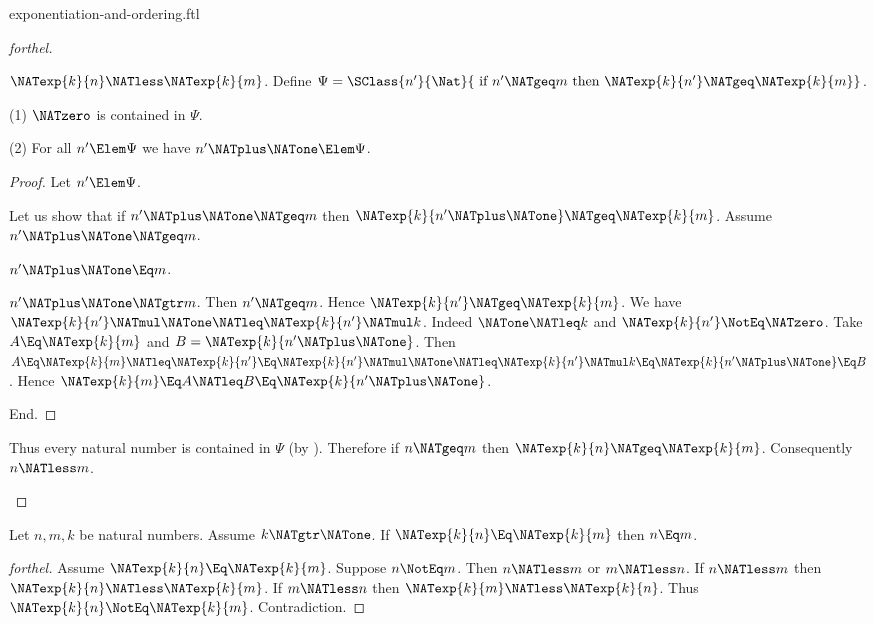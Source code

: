 \documentclass{stex}
\begin{document}
\begin{smodule}{exponentiation-and-ordering.ftl}
\begin{proof}[forthel]
  \begin{case}{$\NATexp{k}{n} \NATless \NATexp{k}{m}$.}
    Define $\Psi = \SClass{n'}{\Nat}{\text{ if }n' \NATgeq m\text{ then }
    \NATexp{k}{n'} \NATgeq \NATexp{k}{m}}$.

    (1) $\NATzero$ is contained in $\Psi$.

    (2) For all $n' \Elem \Psi$ we have $n' \NATplus \NATone \Elem \Psi$.
    \begin{proof}
      Let $n' \Elem \Psi$.

      Let us show that if $n' \NATplus \NATone \NATgeq m$ then $\NATexp{k}{n' \NATplus \NATone} \NATgeq \NATexp{k}{m}$.
        Assume $n' \NATplus \NATone \NATgeq m$.

        \begin{case}{$n' \NATplus \NATone \Eq m$.} \end{case}

        \begin{case}{$n' \NATplus \NATone \NATgtr m$.}
          Then $n' \NATgeq m$.
          Hence $\NATexp{k}{n'} \NATgeq \NATexp{k}{m}$.
          We have $\NATexp{k}{n'} \NATmul \NATone \NATleq \NATexp{k}{n'} \NATmul k$.
          Indeed $\NATone \NATleq k$ and $\NATexp{k}{n'} \NotEq \NATzero$.
          Take $A \Eq \NATexp{k}{m}$ and $B = \NATexp{k}{n' \NATplus \NATone}$. %
          Then $A
            \Eq \NATexp{k}{m}
            \NATleq \NATexp{k}{n'}
            \Eq \NATexp{k}{n'} \NATmul \NATone
            \NATleq \NATexp{k}{n'} \NATmul k
            \Eq \NATexp{k}{n' \NATplus \NATone}
            \Eq B$.
          Hence $\NATexp{k}{m} \Eq A \NATleq B \Eq \NATexp{k}{n' \NATplus \NATone}$.
        \end{case}
      End.
    \end{proof}

    Thus every natural number is contained in $\Psi$ (by ).
    Therefore if $n \NATgeq m$ then $\NATexp{k}{n} \NATgeq \NATexp{k}{m}$.
    Consequently $n \NATless m$.
  \end{case}
\end{proof}

\begin{corollary}[forthel]
  Let $n, m, k$ be natural numbers.
  Assume $k \NATgtr \NATone$.
  If $\NATexp{k}{n} \Eq \NATexp{k}{m}$ then $n \Eq m$.
\end{corollary}
\begin{proof}[forthel]
  Assume $\NATexp{k}{n} \Eq \NATexp{k}{m}$.
  Suppose $n \NotEq m$.
  Then $n \NATless m$ or $m \NATless n$.
  If $n \NATless m$ then $\NATexp{k}{n} \NATless \NATexp{k}{m}$.
  If $m \NATless n$ then $\NATexp{k}{m} \NATless \NATexp{k}{n}$.
  Thus $\NATexp{k}{n} \NotEq \NATexp{k}{m}$.
  Contradiction.
\end{proof}


\end{smodule}
\end{document}
